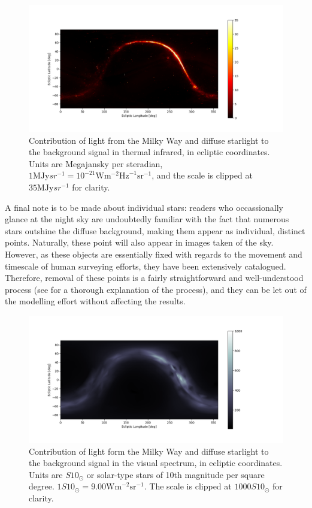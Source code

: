 \begin{figure}[htbp]
 \centering
 \includegraphics[width=1.0\textwidth]{img/background_tir_stars.png}
 \caption{Contribution of light from the Milky Way and diffuse starlight to the background signal in thermal infrared, in ecliptic coordinates. Units are Megajansky per steradian, $1 \mathrm{MJy}{sr}^{-1} = 10^{-21} \mathrm{W}\mathrm{m}^{-2}\mathrm{Hz}^{-1}\mathrm{sr}^{-1}$, and the scale is clipped at $35 \mathrm{MJy}{sr}^{-1}$ for clarity.}
 \label{fig:starstirbackground}
\end{figure}

A final note is to be made about individual stars: readers who occassionally glance at the night sky are undoubtedly familiar with the fact that numerous stars outshine the diffuse background, making them appear as individual, distinct points. Naturally, these point will also appear in images taken of the sky. However, as these objects are essentially fixed with regards to the movement and timescale of human surveying efforts, they have been extensively catalogued. Therefore, removal of these points is a fairly straightforward and well-understood process (see \cite{StarRemoval} for a thorough explanation of the process), and they can be let out of the modelling effort without affecting the results.

\begin{figure}[htbp]
 \centering
 \includegraphics[width=1.0\textwidth]{img/background_vis_stars.png}
 \caption{Contribution of light form the Milky Way and diffuse starlight to the background signal in the visual spectrum, in ecliptic coordinates. Units are $S10_\odot$ or solar-type stars of 10th magnitude per square degree. $1S10_\odot = 9.00\mathrm{W}\mathrm{m}^{-2}\mathrm{sr}^{-1}$. The scale is clipped at $1000 S10_\odot$ for clarity.}
 \label{fig:starsvisbackground}
\end{figure}


